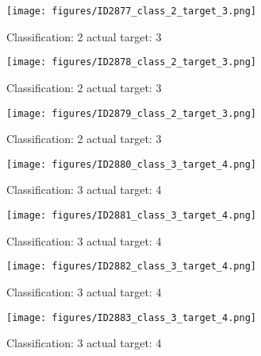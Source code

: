 \begin{figure}[h!]
\begin{center}
\texttt{[image: figures/ID2877\_class\_2\_target\_3.png]}
\end{center}
\caption{ Classification: 2 actual target: 3}
\label{fig:ID2877_class_2_target_3}
\end{figure}
\begin{figure}[h!]
\begin{center}
\texttt{[image: figures/ID2878\_class\_2\_target\_3.png]}
\end{center}
\caption{ Classification: 2 actual target: 3}
\label{fig:ID2878_class_2_target_3}
\end{figure}
\begin{figure}[h!]
\begin{center}
\texttt{[image: figures/ID2879\_class\_2\_target\_3.png]}
\end{center}
\caption{ Classification: 2 actual target: 3}
\label{fig:ID2879_class_2_target_3}
\end{figure}
\begin{figure}[h!]
\begin{center}
\texttt{[image: figures/ID2880\_class\_3\_target\_4.png]}
\end{center}
\caption{ Classification: 3 actual target: 4}
\label{fig:ID2880_class_3_target_4}
\end{figure}
\begin{figure}[h!]
\begin{center}
\texttt{[image: figures/ID2881\_class\_3\_target\_4.png]}
\end{center}
\caption{ Classification: 3 actual target: 4}
\label{fig:ID2881_class_3_target_4}
\end{figure}
\begin{figure}[h!]
\begin{center}
\texttt{[image: figures/ID2882\_class\_3\_target\_4.png]}
\end{center}
\caption{ Classification: 3 actual target: 4}
\label{fig:ID2882_class_3_target_4}
\end{figure}
\begin{figure}[h!]
\begin{center}
\texttt{[image: figures/ID2883\_class\_3\_target\_4.png]}
\end{center}
\caption{ Classification: 3 actual target: 4}
\label{fig:ID2883_class_3_target_4}
\end{figure}
